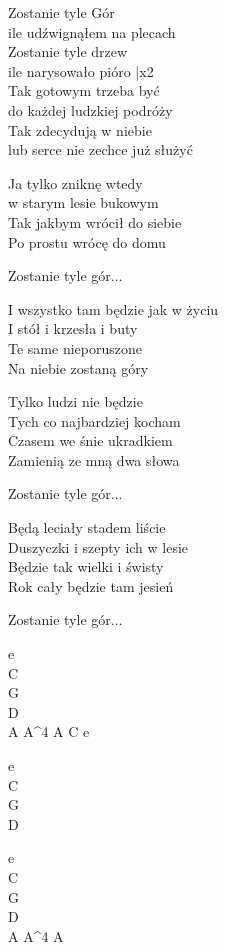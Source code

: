 \begin{text}
    \vin Zostanie tyle Gór\\
    \vin ile udźwignąłem na plecach\\
    \vin Zostanie tyle drzew\\
    \vin ile narysowało pióro |x2\\
	
	Tak gotowym trzeba być\\
	do każdej ludzkiej podróży\\
	Tak zdecydują w niebie\\
	lub serce nie zechce już służyć
	
	Ja tylko zniknę wtedy\\
	w starym lesie bukowym\\
	Tak jakbym wrócił do siebie	\\
	Po prostu wrócę do domu
	
	\vin Zostanie tyle gór...
	
	I wszystko tam będzie jak w życiu\\
	I stół i krzesła i buty\\
	Te same nieporuszone\\
	Na niebie zostaną góry
	
	Tylko ludzi nie będzie\\
	Tych co najbardziej kocham\\
	Czasem we śnie ukradkiem\\
	Zamienią ze mną dwa słowa
	
	\vin Zostanie tyle gór...
	
	Będą leciały stadem liście\\
	Duszyczki i szepty ich w lesie\\
	Będzie tak wielki i świsty\\
	Rok cały będzie tam jesień
    
	\vin Zostanie tyle gór...
\end{text}
\begin{chord}
    e\\
	C\\
	G\\
	D\\
	A A^4 A C e
	
	e\\
	C\\
	G\\
	D
	
	e\\
	C\\
	G\\
	D\\
	A A^4 A
\end{chord}